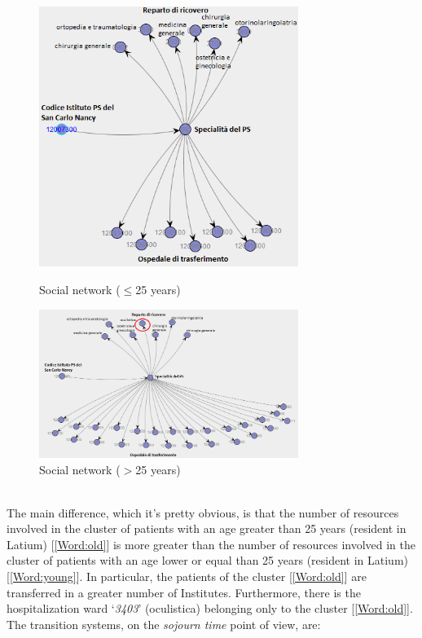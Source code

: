 \begin{figure} [htbp]
\includegraphics[width=0.75\textwidth, keepaspectratio]{ProntoSoccorsoHoWYoungs}
\caption{Social network ($\leq$25 years)}
\includegraphics[width=0.75\textwidth, keepaspectratio]{ProntoSoccorsoHoWOlds}
\caption{Social network ($>$25 years)}
\end{figure}\\
The main difference, which it’s pretty obvious, is that the number of resources involved in the cluster of patients with an age greater than 25 years (resident in Latium) [\ref{Word:old}] is more greater than the number of resources involved in the cluster of patients with an age lower or equal than 25 years (resident in Latium) [\ref{Word:young}]. In particular, the patients of the cluster [\ref{Word:old}] are transferred in a greater number of Institutes. Furthermore, there is the hospitalization ward `\textit{3403}' (oculistica) belonging only to the cluster [\ref{Word:old}]. The transition systems, on the \textit{sojourn time} point of view, are:
